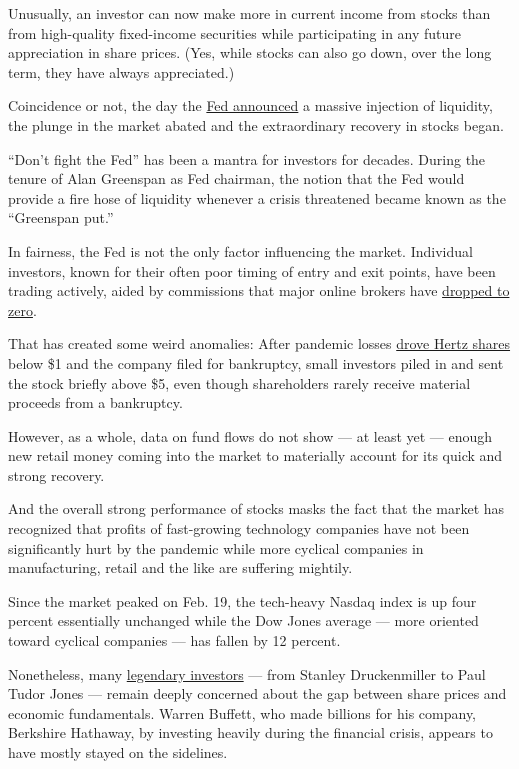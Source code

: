 Unusually, an investor can now make more in current income from stocks
than from high-quality fixed-income securities while participating in
any future appreciation in share prices. (Yes, while stocks can also go
down, over the long term, they have always appreciated.)

Coincidence or not, the day the
\href{https://www.nytimes3xbfgragh.onion/2020/03/23/business/economy/coronavirus-fed-bond-buying.html}{Fed
announced} a massive injection of liquidity, the plunge in the market
abated and the extraordinary recovery in stocks began.

``Don't fight the Fed'' has been a mantra for investors for decades.
During the tenure of Alan Greenspan as Fed chairman, the notion that the
Fed would provide a fire hose of liquidity whenever a crisis threatened
became known as the ``Greenspan put.''

In fairness, the Fed is not the only factor influencing the market.
Individual investors, known for their often poor timing of entry and
exit points, have been trading actively, aided by commissions that major
online brokers have
\href{https://www.nytimes3xbfgragh.onion/2019/10/01/your-money/charles-schwab-free-trades.html}{dropped
to zero}.

That has created some weird anomalies: After pandemic losses
\href{https://www.ft.com/content/b592847a-2061-4460-8aa5-3b22a2153210}{drove
Hertz shares} below \$1 and the company filed for bankruptcy, small
investors piled in and sent the stock briefly above \$5, even though
shareholders rarely receive material proceeds from a bankruptcy.

However, as a whole, data on fund flows do not show --- at least yet ---
enough new retail money coming into the market to materially account for
its quick and strong recovery.

And the overall strong performance of stocks masks the fact that the
market has recognized that profits of fast-growing technology companies
have not been significantly hurt by the pandemic while more cyclical
companies in manufacturing, retail and the like are suffering mightily.

Since the market peaked on Feb. 19, the tech-heavy Nasdaq index is up
four percent essentially unchanged while the Dow Jones average --- more
oriented toward cyclical companies --- has fallen by 12 percent.

Nonetheless, many
\href{https://www.bloomberg.com/news/articles/2020-05-13/wall-street-heavyweights-are-sounding-alarm-about-stock-prices?sref=qN0DZypA}{legendary
investors} --- from Stanley Druckenmiller to Paul Tudor Jones --- remain
deeply concerned about the gap between share prices and economic
fundamentals. Warren Buffett, who made billions for his company,
Berkshire Hathaway, by investing heavily during the financial crisis,
appears to have mostly stayed on the sidelines.


